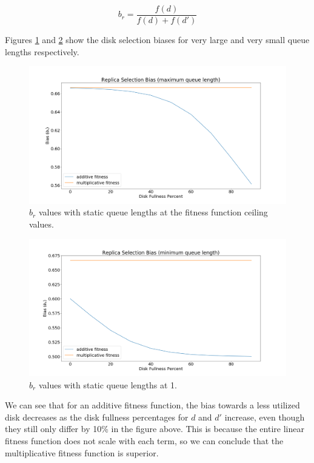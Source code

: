 \documentclass[12pt]{article}
\begin{document}
    \begin{equation}
      b_r = \frac{f(d)}{f(d) + f(d')}
    \end{equation}

    Figures \ref{fig:bias_max_qlen} and \ref{fig:bias_min_qlen} show the disk
    selection biases for very large and very small queue lengths respectively.

    \begin{figure}[h]
      \centering
      \includegraphics[scale=0.32]{images/replica_selection_bias_max_qlen.png} 
      \caption{$b_r$ values with static queue lengths at the fitness
               function ceiling values.}
      \label{fig:bias_max_qlen}
    \end{figure}

    \begin{figure}[h]
      \centering
      \includegraphics[scale=0.32]{images/replica_selection_bias_min_qlen.png} 
      \caption{$b_r$ values with static queue lengths at 1.}
      \label{fig:bias_min_qlen}
    \end{figure}

    We can see that for an additive fitness function, the bias towards a less
    utilized disk decreases as the disk fullness percentages for $d$ and $d'$
    increase, even though they still only differ by 10\% in the figure above.
    This is because the entire linear fitness function does not scale with each
    term, so we can conclude that the multiplicative fitness function is
    superior.
\end{document}
